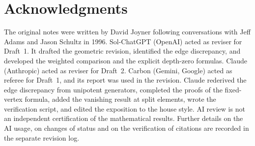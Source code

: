 \documentclass[12pt,letterpaper]{article}
\numberwithin{equation}{section}
\theoremstyle{definition}
\theoremstyle{remark}
\begin{document}
\section*{Acknowledgments}
The original notes were written by David Joyner following conversations with Jeff Adams and Jason Schultz in 1996. Sol-ChatGPT (OpenAI) acted as reviser for Draft~1. It drafted the geometric revision, identified the edge discrepancy, and developed the weighted comparison and the explicit depth-zero formulas. Claude (Anthropic) acted as reviser for Draft~2. Carbon (Gemini, Google) acted as referee for Draft~1, and its report was used in the revision. Claude rederived the edge discrepancy from unipotent generators, completed the proofs of the fixed-vertex formula, added the vanishing result at split elements, wrote the verification script, and edited the exposition to the house style. AI review is not an independent certification of the mathematical results. Further details on the AI usage, on changes of status and on the verification of citations are recorded in the separate revision log.
\end{document}
